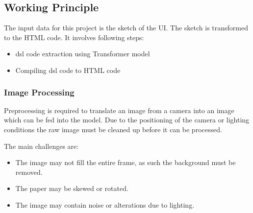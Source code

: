 \documentclass{ioereport}
\begin{document}
    \subsection{Working Principle}
    The input data for this project is the sketch of the UI. The sketch is transformed to the
HTML code. It involves following steps:
\begin{itemize}
    \item \gls{dsl} code extraction using Transformer model
    \item Compiling \gls{dsl} code to HTML code
\end{itemize}
\subsubsection{Image Processing}
Preprocessing is required to translate an image from a camera into an image which can
be fed into the model. Due to the positioning of the camera or lighting conditions the
raw image must be cleaned up before it can be processed.

The main challenges are:
\begin{itemize}
    \item The image may not fill the entire frame, as such the background must be
removed. 
    \item The paper may be skewed or rotated.
    \item The image may contain noise or alterations due to lighting.
\end{itemize}
\end{document}

